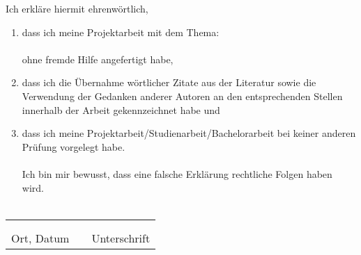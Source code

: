 Ich erkläre hiermit ehrenwörtlich,
\begin{enumerate}[leftmargin=0cm]
	\item 	dass ich meine Projektarbeit mit dem Thema:  \\
			\textbf{\CTITLE} \\
			ohne fremde Hilfe angefertigt habe, \\
	\item	dass ich die Übernahme wörtlicher Zitate aus der Literatur sowie die Verwendung der
			Gedanken anderer Autoren an den entsprechenden Stellen innerhalb der Arbeit gekennzeichnet habe und  \\
	\item	dass ich meine Projektarbeit/Studienarbeit/Bachelorarbeit bei keiner anderen Prüfung vorgelegt habe. \\\\
			Ich bin mir bewusst, dass eine falsche Erklärung rechtliche Folgen haben wird. \\\\
\end{enumerate}
\vspace*{\fill}
\begin{tabular} {lrl}
	\hspace{6cm} & \hspace{3cm} & \hspace{6cm} \\
	\hrulefill & & \hrulefill \\
	Ort, Datum & & Unterschrift
\end{tabular}
\vspace*{\fill}
